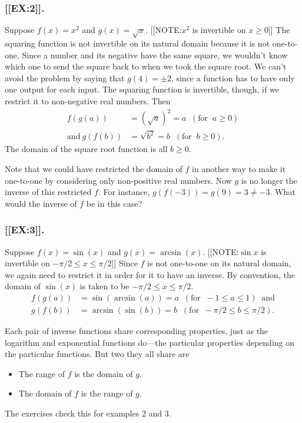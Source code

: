 \subsubsection{[[EX:2]].}
Suppose $f(x)= x^2$ and $g(x) = \sqrt{x}$.
	[[NOTE:$x^2$ is invertible  on $x \geq 0$]]
The squaring function is not invertible on its natural domain because it is not one-to-one.  Since a number and its negative have the same square, we wouldn't know which one to send the square back to when we took the square root.  We can't avoid the problem by saying that $g(4)=\pm 2$, since a function has to have only one output for each input. The squaring function is invertible, though, if we restrict it to non-negative real numbers.  Then
\begin{align*}
f(g(a)) & =  (\sqrt{a})^2 = a \;\; (\mbox{for} \;\; a \geq 0) \\
\mbox{and} \ g(f(b)) & =  \sqrt{b^2} = b \;\; (\mbox{for} \;\; b \geq 0).
\end{align*}
The domain of the square root function is all $b \geq 0$.

Note that we could have restricted the domain of $f$ in another way to
make it one-to-one by considering only non-positive real numbers.  Now
$g$ is no longer the inverse of this restricted $f$.  For instance,
$g(f(-3))=g(9) = 3\neq -3$.  What would the inverse of $f$ be in this
case?





\subsubsection{[[EX:3]].}
Suppose $f(x) = \sin(x)$ and $g(x)=\arcsin(x)$.  
	[[NOTE:$\sin{x}$ is invertible  on
		\mbox{$-\pi/2 \leq x \leq \pi/2$}]]
Since $f$ is not one-to-one on its natural domain, we again need to restrict it in order for it to have an inverse.  By convention, the domain of $\sin(x)$ is taken to be $-\pi/2 \leq x \leq \pi/2$.  
\begin{align*}
f(g(a)) & =  \sin(\arcsin(a)) = a \;\; (\mbox{for} \;\; -1 \leq a \leq 1) \;\; \mbox{and}  \\
g(f(b)) & =  \arcsin(\sin(b)) = b \;\; (\mbox{for} \;\; -\pi/2 \leq b \leq \pi/2).
\end{align*}

	Each pair of inverse functions share corresponding properties, just as the logarithm and exponential functions do---the particular properties depending on the particular functions.  But two they all share are
\begin{itemize}
\item  The range of $f$ is the domain of $g$.
\item  The domain of $f$ is the range of $g$.
\end{itemize}
The exercises check this for examples 2 and 3.

